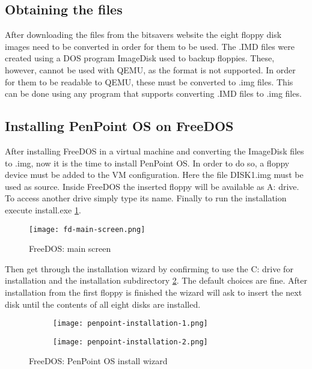 \subsection{Obtaining the files}

After downloading the files from the bitsavers website the eight floppy disk
images need to be converted in order for them to be used. The .IMD files were
created using a DOS program ImageDisk used to backup floppies. These, however,
cannot be used with QEMU, as the format is not supported. In order for them to
be readable to QEMU, these must be converted to .img files. This can be done
using any program that supports converting .IMD files to .img files.

\subsection{Installing PenPoint OS on FreeDOS}

After installing FreeDOS in a virtual machine and converting the ImageDisk
files to .img, now it is the time to install PenPoint OS. In order to do so,
a floppy device must be added to the VM configuration. Here the file DISK1.img
must be used as source. Inside FreeDOS the inserted floppy will be available as A:
drive. To access another drive simply type its name. Finally to run the
installation execute install.exe \ref{fig:fd-main-screen}.

\begin{figure}[H]
    \centering
    \texttt{[image: fd-main-screen.png]}
    \caption{FreeDOS: main screen}
    \label{fig:fd-main-screen}
\end{figure}

Then get through the installation wizard by confirming to use the C: drive for
installation and the installation subdirectory \ref{fig:penpoint-installation}.
The default choices are fine.  After installation from the first floppy is
finished the wizard will ask to insert the next disk until the contents of all
eight disks are installed.

\begin{figure}[H]
    \centering
    \begin{subfigure}[b]{0.45\linewidth}
        \texttt{[image: penpoint-installation-1.png]}
    \end{subfigure}
    \hfill
    \begin{subfigure}[b]{0.45\linewidth}
        \texttt{[image: penpoint-installation-2.png]}
    \end{subfigure}
    \caption{FreeDOS: PenPoint OS install wizard}
    \label{fig:penpoint-installation}
\end{figure}

